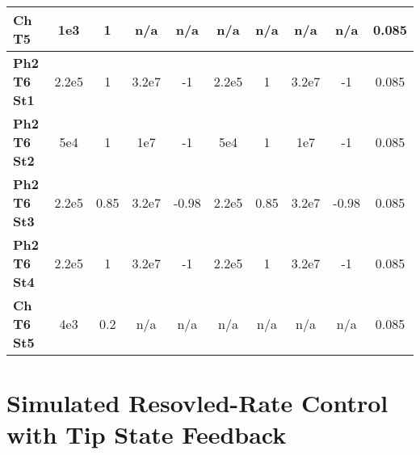 \begin{table}[h]
{\begin{tabular}{l|cc|cc|cc|cc|c|}
\multicolumn{1}{|l|}{\textbf{Ch T5}}      & \multicolumn{1}{c|}{1e3}            & 1                 & \multicolumn{1}{c|}{n/a}            & n/a               & \multicolumn{1}{c|}{n/a}            & n/a               & \multicolumn{1}{c|}{n/a}            & n/a               & 0.085          \\ \hline
\multicolumn{1}{|l|}{\textbf{Ph2 T6 St1}} & \multicolumn{1}{c|}{2.2e5}          & 1                 & \multicolumn{1}{c|}{3.2e7}          & -1                & \multicolumn{1}{c|}{2.2e5}          & 1                 & \multicolumn{1}{c|}{3.2e7}          & -1                & 0.085          \\ \hline
\multicolumn{1}{|l|}{\textbf{Ph2 T6 St2}} & \multicolumn{1}{c|}{5e4}            & 1                 & \multicolumn{1}{c|}{1e7}            & -1                & \multicolumn{1}{c|}{5e4}            & 1                 & \multicolumn{1}{c|}{1e7}            & -1                & 0.085          \\ \hline
\multicolumn{1}{|l|}{\textbf{Ph2 T6 St3}} & \multicolumn{1}{c|}{2.2e5}          & 0.85              & \multicolumn{1}{c|}{3.2e7}          & -0.98             & \multicolumn{1}{c|}{2.2e5}          & 0.85              & \multicolumn{1}{c|}{3.2e7}          & -0.98             & 0.085          \\ \hline
\multicolumn{1}{|l|}{\textbf{Ph2 T6 St4}} & \multicolumn{1}{c|}{2.2e5}          & 1                 & \multicolumn{1}{c|}{3.2e7}          & -1                & \multicolumn{1}{c|}{2.2e5}          & 1                 & \multicolumn{1}{c|}{3.2e7}          & -1                & 0.085          \\ \hline
\multicolumn{1}{|l|}{\textbf{Ch T6 St5}}  & \multicolumn{1}{c|}{4e3}            & 0.2               & \multicolumn{1}{c|}{n/a}            & n/a               & \multicolumn{1}{c|}{n/a}            & n/a               & \multicolumn{1}{c|}{n/a}            & n/a               & 0.085          \\ \hline
\end{tabular}%
}
\end{table}

\section{Simulated Resovled-Rate Control with Tip State Feedback}
\label{sec:chap-4-control}

